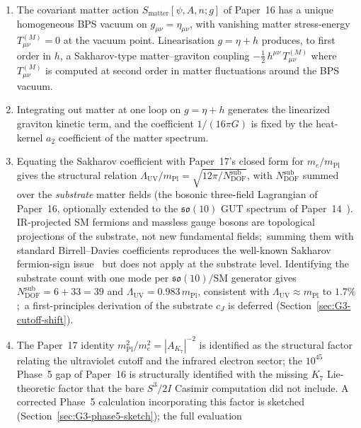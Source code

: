 \documentclass[11pt]{article}
\newcommand{\so}{\mathfrak{so}}
\newcommand{\mPl}{m_{\mathrm{Pl}}}
\newcommand{\me}{m_e}
\begin{document}
\begin{enumerate}
\item The covariant matter action $S_{\mathrm{matter}}[\psi, A, n; g]$
      of Paper~16 has a unique homogeneous BPS vacuum on
      $g_{\mu\nu} = \eta_{\mu\nu}$, with vanishing matter
      stress-energy $T^{(M)}_{\mu\nu} = 0$ at the vacuum point.
      Linearisation $g = \eta + h$ produces, to first order in
      $h$, a Sakharov-type matter--graviton coupling
      $-\tfrac{1}{2}\,h^{\mu\nu}\,T^{(M)}_{\mu\nu}$
      where $T^{(M)}_{\mu\nu}$ is computed at second order in
      matter fluctuations around the BPS vacuum.
\item Integrating out matter at one loop on $g = \eta + h$
      generates the linearized graviton kinetic term, and the
      coefficient $1/(16\pi G)$ is fixed by the heat-kernel $a_2$
      coefficient of the matter spectrum.
\item Equating the Sakharov coefficient with Paper~17's closed
      form for $\me/\mPl$ gives the structural relation
      $\Lambda_{\mathrm{UV}}/\mPl =
      \sqrt{12\pi/N_{\mathrm{DOF}}^{\mathrm{sub}}}$, with
      $N_{\mathrm{DOF}}^{\mathrm{sub}}$ summed over the
      \emph{substrate} matter fields (the bosonic three-field
      Lagrangian of Paper~16, optionally extended to the
      $\so(10)$ GUT spectrum of Paper~14~\cite{paper14}).  IR-projected
      SM fermions and massless gauge bosons are topological
      projections of the substrate, not new fundamental fields;\
      summing them with standard Birrell--Davies coefficients
      reproduces the well-known Sakharov fermion-sign
      issue~\cite{adler1982, visser2002} but does not apply at the
      substrate level.  Identifying the substrate count with one
      mode per $\so(10)/\mathrm{SM}$ generator gives
      $N_{\mathrm{DOF}}^{\mathrm{sub}} = 6 + 33 = 39$ and
      $\Lambda_{\mathrm{UV}} = 0.983\,\mPl$, consistent with
      $\Lambda_{\mathrm{UV}} \approx \mPl$ to $1.7\%$;\ a
      first-principles derivation of the substrate $c_J$ is
      deferred (Section~\ref{sec:G3-cutoff-shift}).
\item The Paper~17 identity $\mPl^2/\me^2 = |A_{K_7}|^{-2}$ is
      identified as the structural factor relating the ultraviolet
      cutoff and the infrared electron sector; the $10^{45}$
      Phase~5 gap of Paper~16 is structurally identified with the
      missing $K_7$ Lie-theoretic factor that the bare
      $S^3/2I$ Casimir computation did not include.  A corrected
      Phase~5 calculation incorporating this factor is sketched
      (Section~\ref{sec:G3-phase5-sketch}); the full evaluation

\end{enumerate}
\end{document}
